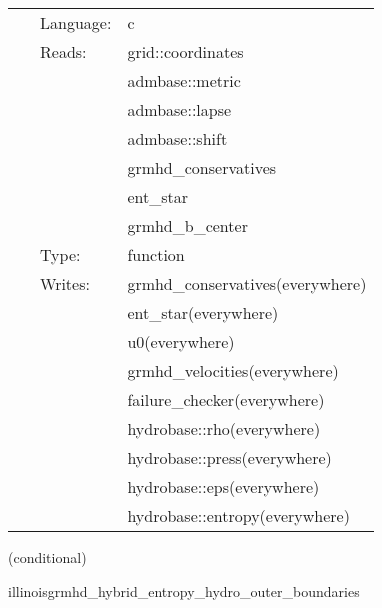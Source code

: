 \documentclass{article}
\begin{document}
 \begin{tabular*}{160mm}{cll} 
~ & Language:  & c \\ 
~ & Reads:  & grid::coordinates \\ 
~& ~ &admbase::metric\\ 
~& ~ &admbase::lapse\\ 
~& ~ &admbase::shift\\ 
~& ~ &grmhd\_conservatives\\ 
~& ~ &ent\_star\\ 
~& ~ &grmhd\_b\_center\\ 
~ & Type:  & function \\ 
~ & Writes:  & grmhd\_conservatives(everywhere) \\ 
~& ~ &ent\_star(everywhere)\\ 
~& ~ &u0(everywhere)\\ 
~& ~ &grmhd\_velocities(everywhere)\\ 
~& ~ &failure\_checker(everywhere)\\ 
~& ~ &hydrobase::rho(everywhere)\\ 
~& ~ &hydrobase::press(everywhere)\\ 
~& ~ &hydrobase::eps(everywhere)\\ 
~& ~ &hydrobase::entropy(everywhere)\\ 
\end{tabular*} 


\vspace{5mm}

   (conditional) 

\hspace{5mm} illinoisgrmhd\_hybrid\_entropy\_hydro\_outer\_boundaries 

\hspace{5mm}{\it entropy+hybrid version of illinoisgrmhd\_hydro\_outer\_boundaries } 


\hspace{5mm}
\end{document}
